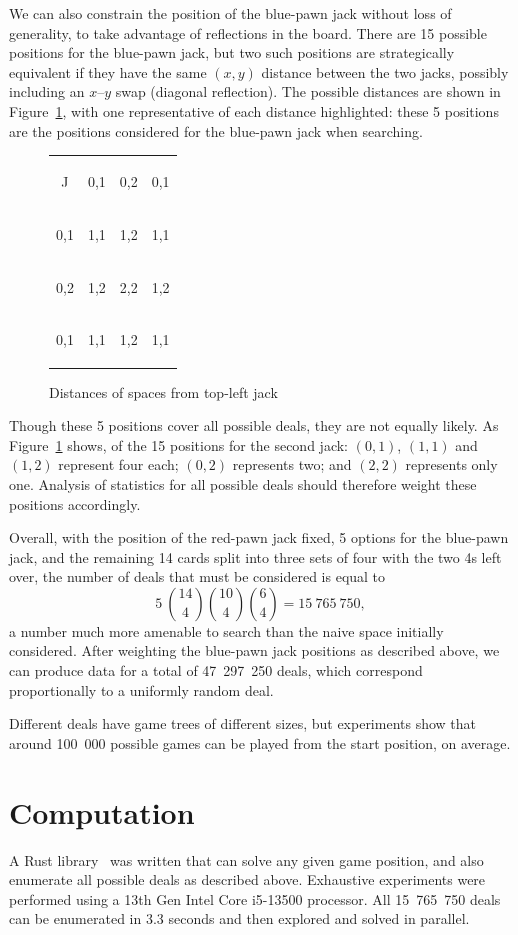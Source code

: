 \documentclass[a4paper, twocolumn]{article}
\newcommand\card[1]{\begin{tcolorbox}#1\end{tcolorbox}}
\newcommand\emphcard[1]{\begin{tcolorbox}[colback=red!30]#1\end{tcolorbox}}
\newcommand\customboard[8]{
  \setlength{\tabcolsep}{0.1cm}
  \begin{tabular}{c c c c}
    #1 & #2 & #3 & #4 \\
    #5 & #6 & #7 & #8 \\
    \customboardmore
}
\newcommand\customboardmore[8]{
    #1 & #2 & #3 & #4 \\
    #5 & #6 & #7 & #8
  \end{tabular}
}
\begin{document}
We can also constrain the position of the blue-pawn jack without loss of
generality, to take advantage of reflections in the board. There are 15 possible
positions for the blue-pawn jack, but two such positions are strategically
equivalent if they have the same $(x, y)$ distance between the two jacks,
possibly including an $x$--$y$ swap (diagonal reflection). The
possible distances are shown in Figure~\ref{fig:jack-distances}, with one
representative of each distance highlighted: these 5 positions are the positions
considered for the blue-pawn jack when searching.

\begin{figure}[ht]
  \centering
  \customboard
  {\card{J}} {\emphcard{0,1}} {\emphcard{0,2}} {\card{0,1}}
  {\card{0,1}} {\emphcard{1,1}} {\emphcard{1,2}} {\card{1,1}}
  {\card{0,2}} {\card{1,2}} {\emphcard{2,2}} {\card{1,2}}
  {\card{0,1}} {\card{1,1}} {\card{1,2}} {\card{1,1}}
  \caption{Distances of spaces from top-left jack}
  \label{fig:jack-distances}
\end{figure}

Though these 5 positions cover all possible deals, they are not equally
likely. As Figure~\ref{fig:jack-distances} shows, of the 15 positions for the
second jack: $(0,1)$, $(1,1)$ and $(1,2)$ represent four each; $(0,2)$
represents two; and $(2,2)$ represents only one. Analysis of statistics for all
possible deals should therefore weight these positions accordingly.

Overall, with the position of the red-pawn jack fixed, 5 options for the blue-pawn jack,
and the remaining 14 cards split into three sets of four with the two 4s left
over, the number of deals that must be considered is equal to
\[5~\binom{14}{4} \binom{10}{4} \binom{6}{4} = 15~765~750,\]
a number much more amenable to search than the naive space initially considered.
After weighting the blue-pawn jack positions as described above, we can produce
data for a total of 47~297~250 deals, which correspond proportionally to a
uniformly random deal.

Different deals have game trees of different sizes, but experiments show that
around 100~000 possible games can be played from the start position, on average.


\section{Computation}

A Rust library~\cite{github} was written that can solve any given game position,
and also enumerate all possible deals as described above. Exhaustive experiments
were performed using a 13th Gen Intel Core i5-13500 processor. All 15~765~750
deals can be enumerated in 3.3 seconds and then explored and solved in parallel.
\end{document}
